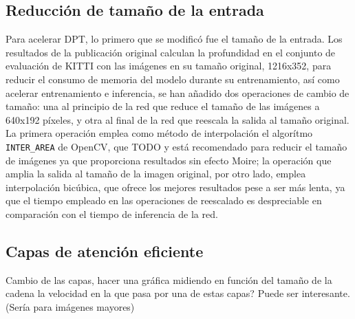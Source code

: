 \subsection{Reducción de tamaño de la entrada}
Para acelerar DPT, lo primero que se modificó fue el tamaño de la entrada. Los resultados de la publicación original calculan la profundidad en el conjunto de evaluación de KITTI con las imágenes en su tamaño original, 1216x352, para reducir el consumo de memoria del modelo durante su entrenamiento, así como acelerar entrenamiento e inferencia, se han añadido dos operaciones de cambio de tamaño: una al principio de la red que reduce el tamaño de las imágenes a 640x192 píxeles, y otra al final de la red que reescala la salida al tamaño original. La primera operación emplea como método de interpolación el algorítmo \texttt{INTER{\_}AREA} de OpenCV, que TODO y está recomendado para reducir el tamaño de imágenes ya que proporciona resultados sin efecto Moire; la operación que amplia la salida al tamaño de la imagen original, por otro lado, emplea interpolación bicúbica, que ofrece los mejores resultados pese a ser más lenta, ya que el tiempo empleado en las operaciones de reescalado es despreciable en comparación con el tiempo de inferencia de la red.



\subsection{Capas de atención eficiente}
Cambio de las capas, hacer una gráfica midiendo en función del tamaño de la cadena la velocidad en la que pasa por una de estas capas? Puede ser interesante. (Sería para imágenes mayores)


